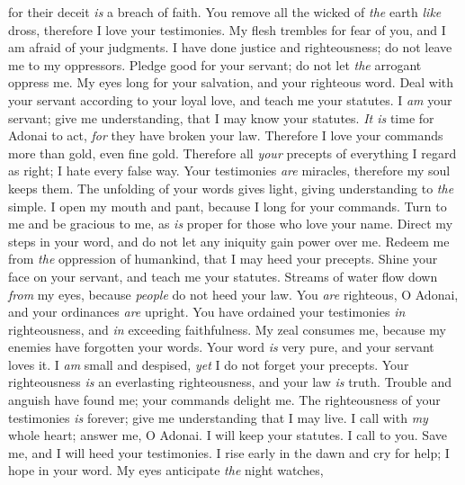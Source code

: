 \begin{biblechapter}
for their deceit \textit{is} a breach of faith.
\verse You remove all the wicked of \textit{the} earth \textit{like} dross, 
therefore I love your testimonies.
\verse My flesh trembles for fear of you, 
and I am afraid of your judgments.
 I have done justice and righteousness; 
do not leave me to my oppressors.
\verse Pledge good for your servant; 
do not let \textit{the} arrogant oppress me.
\verse My eyes long for your salvation, 
and your righteous word.
\verse Deal with your servant according to your loyal love, 
and teach me your statutes.
\verse I \textit{am} your servant; give me understanding, 
that I may know your statutes.
\verse \textit{It is} time for Adonai to act, 
\textit{for} they have broken your law.
\verse Therefore I love your commands 
more than gold, even fine gold.
\verse Therefore all \textit{your} precepts of everything I regard as right; 
I hate every false way.
 Your testimonies \textit{are} miracles, 
therefore my soul keeps them.
\verse The unfolding of your words gives light, 
giving understanding to \textit{the} simple.
\verse I open my mouth and pant, 
because I long for your commands.
\verse Turn to me and be gracious to me, 
as \textit{is} proper for those who love your name.
\verse Direct my steps in your word, 
and do not let any iniquity gain power over me.
\verse Redeem me from \textit{the} oppression of humankind, 
that I may heed your precepts.
\verse Shine your face on your servant, 
and teach me your statutes.
\verse Streams of water flow down \textit{from} my eyes, 
because \textit{people} do not heed your law.
 You \textit{are} righteous, O Adonai, 
and your ordinances \textit{are} upright.
\verse You have ordained your testimonies \textit{in} righteousness, 
and \textit{in} exceeding faithfulness.
\verse My zeal consumes me, 
because my enemies have forgotten your words.
\verse Your word \textit{is} very pure, 
and your servant loves it.
\verse I \textit{am} small and despised, 
\textit{yet} I do not forget your precepts.
\verse Your righteousness \textit{is} an everlasting righteousness, 
and your law \textit{is} truth.
\verse Trouble and anguish have found me; 
your commands delight me.
\verse The righteousness of your testimonies \textit{is} forever; 
give me understanding that I may live.
 I call with \textit{my} whole heart; answer me, O Adonai. 
I will keep your statutes.
\verse I call to you. Save me, 
and I will heed your testimonies.
\verse I rise early in the dawn and cry for help; 
I hope in your word.
\verse My eyes anticipate \textit{the} night watches, 

\end{biblechapter}
